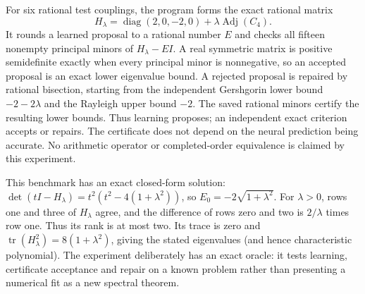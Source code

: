 For six rational test couplings, the program forms the exact rational matrix
\[
 H_\lambda=\operatorname{diag}(2,0,-2,0)+\lambda\operatorname{Adj}(C_4).
\]
It rounds a learned proposal to a rational number $E$ and checks all fifteen nonempty principal minors of $H_\lambda-EI$. A real symmetric matrix is positive semidefinite exactly when every principal minor is nonnegative, so an accepted proposal is an exact lower eigenvalue bound. A rejected proposal is repaired by rational bisection, starting from the independent Gershgorin lower bound $-2-2\lambda$ and the Rayleigh upper bound $-2$. The saved rational minors certify the resulting lower bounds. Thus learning proposes; an independent exact criterion accepts or repairs. The certificate does not depend on the neural prediction being accurate. No arithmetic operator or completed-order equivalence is claimed by this experiment.

This benchmark has an exact closed-form solution: $\det(tI-H_\lambda)=t^2(t^2-4(1+\lambda^2))$, so $E_0=-2\sqrt{1+\lambda^2}$. For $\lambda>0$, rows one and three of $H_\lambda$ agree, and the difference of rows zero and two is $2/\lambda$ times row one. Thus its rank is at most two. Its trace is zero and $\operatorname{tr}(H_\lambda^2)=8(1+\lambda^2)$, giving the stated eigenvalues (and hence characteristic polynomial). The experiment deliberately has an exact oracle: it tests learning, certificate acceptance and repair on a known problem rather than presenting a numerical fit as a new spectral theorem.
